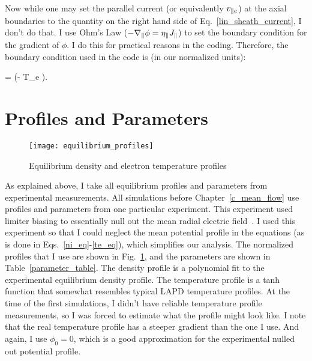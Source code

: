 Now while one may set the parallel current (or equivalently $v_{\parallel e}$) at the axial boundaries to the quantity on the right hand side of Eq.~\ref{lin_sheath_current}, I don't do that.
I use Ohm's Law ($- \nabla_\parallel \phi = \eta_\parallel J_\parallel$) to set the boundary condition for the gradient of $\phi$. I do this for practical reasons in the coding. Therefore, the
boundary condition used in the code is (in our normalized units):

\beq
\label{sheath_bc}
\gradpar \phi = \pm {} \left(\phi - \Lambda T_e  \right).
\eeq



\section{Profiles and Parameters}
\label{s_profs_params}

\begin{figure}[!ht]
\texttt{[image: equilibrium\_profiles]}
\centering
\caption{Equilibrium density and electron temperature profiles}
\label{equilibrium_profiles}
\end{figure}


As explained above, I take all equilibrium profiles and parameters from experimental measurements. 
All simulations before Chapter~\ref{c_mean_flow} use profiles and parameters from one particular experiment.
This experiment used limiter biasing to essentially null out the mean radial electric field~\cite{schaffner2012}. I used this experiment so that I could neglect the mean potential profile
in the equations (as is done in Eqs.~\ref{ni_eq}-\ref{te_eq}), which simplifies our analysis. The normalized profiles that I use are shown in Fig.~\ref{equilibrium_profiles}, and the parameters
are shown in Table~\ref{parameter_table}. The density profile is
a polynomial fit to the experimental equilibrium density profile. The temperature profile is a tanh function that somewhat resembles typical LAPD temperature profiles. At the time of the first
simulations, I didn't have reliable temperature profile measurements, so I was forced to estimate what the profile might look like. I note that the real temperature profile has a steeper
gradient than the one I use. And again, I use $\phi_0 = 0$, which is a good approximation for the experimental nulled out potential profile.

